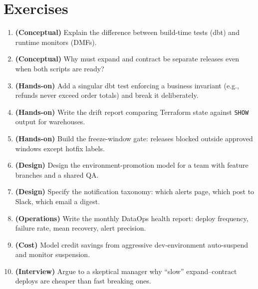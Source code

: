 \section{Exercises}
\begin{enumerate}
    \item \textbf{(Conceptual)} Explain the difference between build-time tests (dbt) and runtime monitors (DMFs).
    \item \textbf{(Conceptual)} Why must expand and contract be separate releases even when both scripts are ready?
    \item \textbf{(Hands-on)} Add a singular dbt test enforcing a business invariant (e.g., refunds never exceed order totals) and break it deliberately.
    \item \textbf{(Hands-on)} Write the drift report comparing Terraform state against \texttt{SHOW} output for warehouses.
    \item \textbf{(Hands-on)} Build the freeze-window gate: releases blocked outside approved windows except hotfix labels.
    \item \textbf{(Design)} Design the environment-promotion model for a team with feature branches and a shared QA.
    \item \textbf{(Design)} Specify the notification taxonomy: which alerts page, which post to Slack, which email a digest.
    \item \textbf{(Operations)} Write the monthly DataOps health report: deploy frequency, failure rate, mean recovery, alert precision.
    \item \textbf{(Cost)} Model credit savings from aggressive dev-environment auto-suspend and monitor suspension.
    \item \textbf{(Interview)} Argue to a skeptical manager why ``slow'' expand--contract deploys are cheaper than fast breaking ones.
\end{enumerate}
